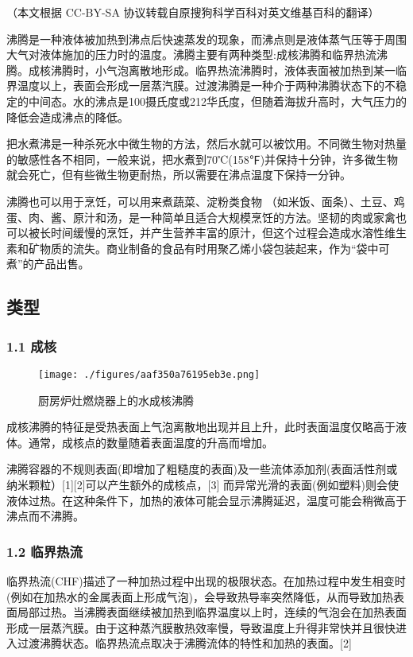 
（本文根据 CC-BY-SA 协议转载自原搜狗科学百科对英文维基百科的翻译）

沸腾是一种液体被加热到沸点后快速蒸发的现象，而沸点则是液体蒸气压等于周围大气对液体施加的压力时的温度。沸腾主要有两种类型:成核沸腾和临界热流沸腾。成核沸腾时，小气泡离散地形成。临界热流沸腾时，液体表面被加热到某一临界温度以上，表面会形成一层蒸汽膜。过渡沸腾是一种介于两种沸腾状态下的不稳定的中间态。水的沸点是100摄氏度或212华氏度，但随着海拔升高时，大气压力的降低会造成沸点的降低。

把水煮沸是一种杀死水中微生物的方法，然后水就可以被饮用。不同微生物对热量的敏感性各不相同，一般来说，把水煮到70℃(158℉)并保持十分钟，许多微生物就会死亡，但有些微生物更耐热，所以需要在沸点温度下保持一分钟。

沸腾也可以用于烹饪，可以用来煮蔬菜、淀粉类食物 （如米饭、面条）、土豆、鸡蛋、肉、酱、原汁和汤，是一种简单且适合大规模烹饪的方法。坚韧的肉或家禽也可以被长时间缓慢的烹饪，并产生营养丰富的原汁，但这个过程会造成水溶性维生素和矿物质的流失。商业制备的食品有时用聚乙烯小袋包装起来，作为“袋中可煮”的产品出售。

\subsection{类型}
\subsubsection{1.1 成核}
\begin{figure}[ht]
\centering
\texttt{[image: ./figures/aaf350a76195eb3e.png]}
\caption{厨房炉灶燃烧器上的水成核沸腾} \label{fig_FT_1}
\end{figure}

成核沸腾的特征是受热表面上气泡离散地出现并且上升，此时表面温度仅略高于液体。通常，成核点的数量随着表面温度的升高而增加。

沸腾容器的不规则表面(即增加了粗糙度的表面)及一些流体添加剂(表面活性剂或纳米颗粒）[1][2]可以产生额外的成核点，[3] 而异常光滑的表面(例如塑料)则会使液体过热。在这种条件下，加热的液体可能会显示沸腾延迟，温度可能会稍微高于沸点而不沸腾。

\subsubsection{1.2 临界热流}
临界热流(CHF)描述了一种加热过程中出现的极限状态。在加热过程中发生相变时(例如在加热水的金属表面上形成气泡)，会导致热导率突然降低，从而导致加热表面局部过热。当沸腾表面继续被加热到临界温度以上时，连续的气泡会在加热表面形成一层蒸汽膜。由于这种蒸汽膜散热效率慢，导致温度上升得非常快并且很快进入过渡沸腾状态。临界热流点取决于沸腾流体的特性和加热的表面。[2]

